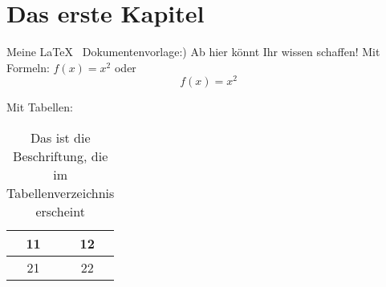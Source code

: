 \documentclass[a4paper]{article}
\begin{document}
\section{Das erste Kapitel}
Meine \LaTeX~ Dokumentenvorlage:)
Ab hier könnt Ihr wissen schaffen! Mit Formeln: $f(x)=x^2$ oder \[f(x)=x^2\]

Mit Tabellen: 
\begin{table}[!b]
	\begin{center}
		\begin{tabular}{|c|c|}
			\hline 
			11 & 12 \\ 
			\hline 
			21 & 22 \\ 
			\hline 
		\end{tabular} 
		\caption{Das ist die Beschriftung, die im Tabellenverzeichnis erscheint}
	\end{center}	
\end{table}


\newpage
\tableofcontents
\listoffigures
\listoftables
\end{document}
